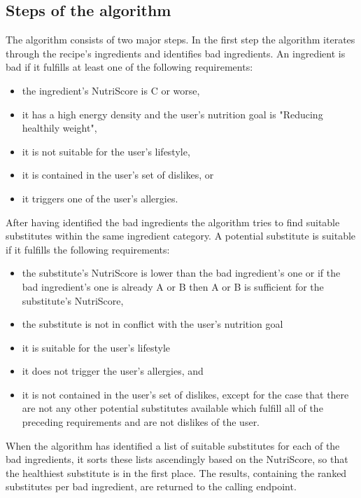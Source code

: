 \subsection*{Steps of the algorithm}
The algorithm consists of two major steps. In the first step the algorithm iterates through the recipe's ingredients and identifies bad ingredients. An ingredient is bad if it fulfills at least one of the following requirements:
\begin{itemize}
	\itemsep-0.5em 
	\item the ingredient's NutriScore is C or worse,
	\item it has a high energy density and the user's nutrition goal is "Reducing healthily weight",
	\item it is not suitable for the user's lifestyle,
	\item it is contained in the user's set of dislikes, or
	\item it triggers one of the user's allergies.
\end{itemize}

\bigskip \bigskip
              
After having identified the bad ingredients the algorithm tries to find suitable substitutes within the same ingredient category. A potential substitute is suitable if it fulfills the following requirements:
\begin{itemize}
	\itemsep-0.5em 
	\item  the substitute's NutriScore is lower than the bad ingredient's one or if the bad ingredient's one is already A or B then A or B is sufficient for the substitute's NutriScore,
	\item the substitute is not in conflict with the user's nutrition goal
	\item it is suitable for the user's lifestyle
	\item it does not trigger the user's allergies, and
	\item it is not contained in the user's set of dislikes, except for the case that there are not any other potential substitutes available which fulfill all of the preceding requirements and are not dislikes of the user.
\end{itemize}
When the algorithm has identified a list of suitable substitutes for each of the bad ingredients, it sorts these lists ascendingly based on the NutriScore, so that the healthiest substitute is in the first place. The results, containing the ranked substitutes per bad ingredient, are returned to the calling endpoint.

